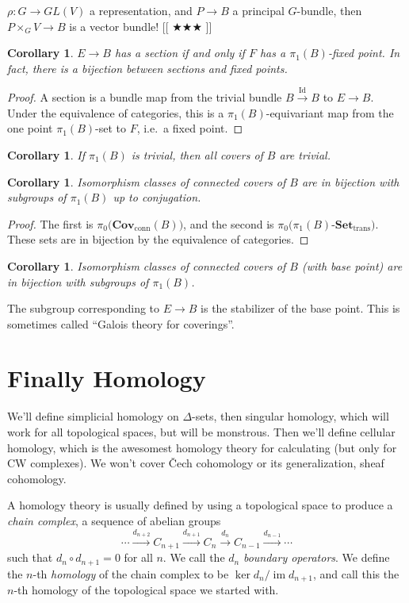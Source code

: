 \documentclass[12pt]{article}
\makeatletter
\theoremstyle{plain}
\newtheorem{corollary}[equation]{Corollary}
\theoremstyle{definition}
\theoremstyle{remark}
\newcommand{\anton}[1]{[[\index{"!@notes and corrections}
                        \ensuremath{\bigstar\bigstar\bigstar} #1]]}
\newcommand{\id}{\mathrm{Id}}
\DeclareMathOperator{\im}{im}
\makeatother
\begin{document}
 $\rho:G\to GL(V)$ a representation, and $P\to B$ a principal $G$-bundle, then $P\times_G
 V\to B$ is a vector bundle! \anton{}

 \begin{corollary}
   $E\to B$ has a section if and only if $F$ has a $\pi_1(B)$-fixed point. In fact, there
   is a bijection between sections and fixed points.
 \end{corollary}
 \begin{proof}
   A section is a bundle map from the trivial bundle $B\xrightarrow{\id} B$ to $E\to B$.
   Under the equivalence of categories, this is a $\pi_1(B)$-equivariant map from the one
   point $\pi_1(B)$-set to $F$, i.e.~a fixed point.
 \end{proof}
 \begin{corollary}
   If $\pi_1(B)$ is trivial, then all covers of $B$ are trivial.
 \end{corollary}
 \begin{corollary}
   Isomorphism classes of connected covers of $B$ are in bijection with subgroups of
   $\pi_1(B)$ up to conjugation.
 \end{corollary}
 \begin{proof}
   The first is $\pi_0\bigl(\textbf{Cov}_\text{conn}(B)\bigr)$, and the second is
   $\pi_0\bigl( \pi_1(B)\text{-}\textbf{Set}_\text{trans}\bigr)$. These sets are in
   bijection by the equivalence of categories.
 \end{proof}
 \begin{corollary}
   Isomorphism classes of connected covers of $B$ (with base point) are in bijection with
   subgroups of $\pi_1(B)$.
 \end{corollary}
 The subgroup corresponding to $E\to B$ is the stabilizer of the base point. This is
 sometimes called ``Galois theory for coverings''.

 \section{Finally Homology}
 We'll define simplicial homology on $\Delta$-sets, then singular homology, which will
 work for all topological spaces, but will be monstrous. Then we'll define cellular
 homology, which is the awesomest homology theory for calculating (but only for CW
 complexes). We won't cover \v Cech cohomology or its generalization, sheaf cohomology.

 A homology theory is usually defined by using a topological space to produce a
\emph{chain complex}, a sequence of abelian groups
 \[
    \cdots \xrightarrow{d_{n+2}} C_{n+1}\xrightarrow{d_{n+1}} C_n\xrightarrow{d_n} C_{n-1} \xrightarrow{d_{n-1}}\cdots
 \]
 such that $d_n\circ d_{n+1}=0$ for all $n$. We call the $d_n$ \emph{boundary operators}.
 We define the $n$-th \emph{homology} of the chain complex to be $\ker d_{n}/\im
 d_{n+1}$, and call this the $n$-th homology of the topological space we started with.
\end{document}
